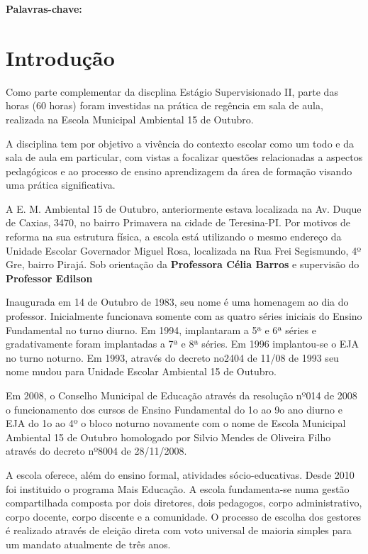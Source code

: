 \documentclass[a4paper,10pt]{article}
\begin{document}
  \textbf{Palavras-chave:} 
  

  \section{Introdução}
    Como parte complementar da discplina Estágio Supervisionado II, parte das horas (60 horas) foram investidas na prática de regência em
    sala de aula, realizada na Escola Municipal Ambiental 15 de Outubro. 
    
    A disciplina tem por objetivo a vivência do contexto escolar como um todo e da sala de aula em particular, com vistas a focalizar questões 
    relacionadas a aspectos pedagógicos e ao processo de ensino aprendizagem da área de formação visando uma prática significativa.
  
    A E. M. Ambiental 15 de Outubro, anteriormente estava localizada na Av. Duque de Caxias, 3470, no bairro Primavera na cidade de Teresina-PI. 
    Por motivos de reforma na sua estrutura física, a escola está utilizando o mesmo endereço da Unidade Escolar Governador Miguel Rosa, localizada 
    na Rua Frei Segismundo, 4º Gre, bairro Pirajá. Sob orientação da \textbf{Professora Célia Barros} e supervisão do \textbf{Professor Edilson}
    
    Inaugurada em 14 de Outubro de 1983, seu nome é uma homenagem ao dia do professor. Inicialmente funcionava somente com as quatro séries 
    iniciais do Ensino Fundamental no turno diurno. Em 1994, implantaram a 5ª e 6ª séries e gradativamente foram implantadas a 7ª e 8ª séries. Em 
    1996 implantou-se o EJA no turno noturno. Em 1993, através do decreto no2404 de 11/08 de 1993 seu nome mudou para Unidade Escolar Ambiental 
    15 de Outubro. 
    
    Em 2008, o Conselho Municipal de Educação através da resolução nº014 de 2008 o funcionamento dos cursos de Ensino 
    Fundamental do 1o ao 9o ano diurno e EJA do 1o ao 4º o bloco noturno novamente com o nome de Escola Municipal Ambiental 15 de Outubro 
    homologado por Silvio Mendes de Oliveira Filho através do decreto nº8004 de 28/11/2008. 
    
    A escola oferece, além do ensino formal, atividades sócio-educativas. Desde 2010 foi instituido o programa Mais Educação. A escola 
    fundamenta-se numa gestão compartilhada composta por dois diretores, dois pedagogos, corpo administrativo, corpo docente, corpo discente e a 
    comunidade. O processo de escolha dos gestores é realizado através de eleição direta com voto universal de maioria simples para um mandato 
    atualmente de três anos.
    
\end{document}
